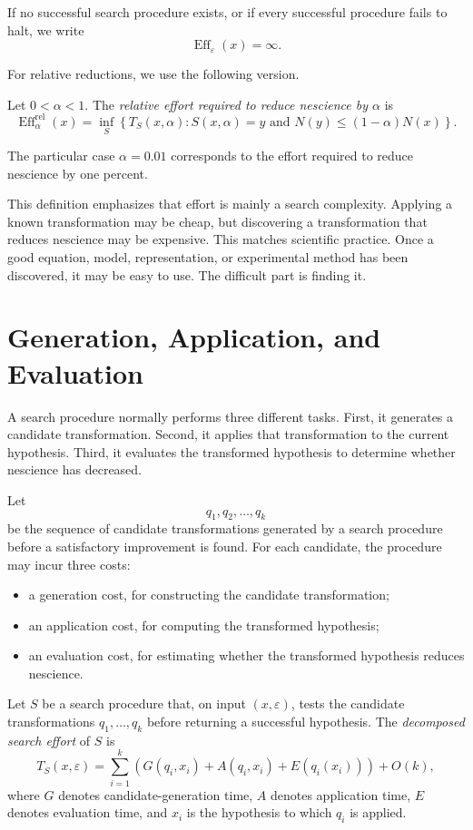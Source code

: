 If no successful search procedure exists, or if every successful procedure fails to halt, we write
\[
\operatorname{Eff}_{\varepsilon}(x)=\infty.
\]

For relative reductions, we use the following version.

\begin{definition}
Let \(0<\alpha<1\). The \emph{relative effort required to reduce nescience by \(\alpha\)} is
\[
\operatorname{Eff}_{\alpha}^{\mathrm{rel}}(x)
=
\inf_{S}
\left\{
T_S(x,\alpha):
S(x,\alpha)=y
\text{ and }
N(y)\leq (1-\alpha)N(x)
\right\}.
\]
\end{definition}

The particular case \(\alpha=0.01\) corresponds to the effort required to reduce nescience by one percent.

This definition emphasizes that effort is mainly a search complexity. Applying a known transformation may be cheap, but discovering a transformation that reduces nescience may be expensive. This matches scientific practice. Once a good equation, model, representation, or experimental method has been discovered, it may be easy to use. The difficult part is finding it.

\section{Generation, Application, and Evaluation}
\label{sec:generation_application_evaluation}

A search procedure normally performs three different tasks. First, it generates a candidate transformation. Second, it applies that transformation to the current hypothesis. Third, it evaluates the transformed hypothesis to determine whether nescience has decreased.

Let
\[
q_1,q_2,\ldots,q_k
\]
be the sequence of candidate transformations generated by a search procedure before a satisfactory improvement is found. For each candidate, the procedure may incur three costs:
\begin{itemize}
    \item a generation cost, for constructing the candidate transformation;
    \item an application cost, for computing the transformed hypothesis;
    \item an evaluation cost, for estimating whether the transformed hypothesis reduces nescience.
\end{itemize}

\begin{definition}
Let \(S\) be a search procedure that, on input \((x,\varepsilon)\), tests the candidate transformations \(q_1,\ldots,q_k\) before returning a successful hypothesis. The \emph{decomposed search effort} of \(S\) is
\[
T_S(x,\varepsilon)
=
\sum_{i=1}^{k}
\left(
G(q_i,x_i)+A(q_i,x_i)+E(q_i(x_i))
\right)
+O(k),
\]
where \(G\) denotes candidate-generation time, \(A\) denotes application time, \(E\) denotes evaluation time, and \(x_i\) is the hypothesis to which \(q_i\) is applied.
\end{definition}

